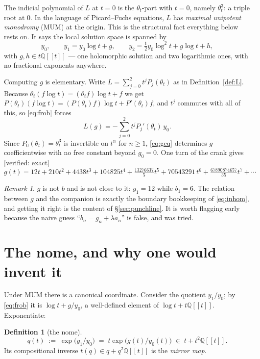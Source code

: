 \documentclass[11pt,reqno]{amsart}
\theoremstyle{plain}
\theoremstyle{definition}
\newtheorem{definition}[theorem]{Definition}
\theoremstyle{remark}
\newtheorem{remark}[theorem]{Remark}
\newcommand{\Q}{\mathbb{Q}}
\newcommand{\Ver}[1]{\textup{\textsf{[verified: #1]}}}
\newcommand{\ta}{\theta_t}
\numberwithin{equation}{section}
\begin{document}
\medskip
The indicial polynomial of $L$ at $t=0$ is the $\ta$-part with $t=0$, namely
$\ta^3$: a triple root at $0$. In the language of Picard--Fuchs equations, $L$
has \emph{maximal unipotent monodromy} (MUM) at the origin. This is the
structural fact everything below rests on. It says the local solution space is
spanned by
\begin{equation}\label{eq:frob}
  y_0,\qquad
  y_1=y_0\log t+g,\qquad
  y_2=\tfrac12y_0\log^2t+g\log t+h,
\end{equation}
with $g,h\in t\Q[[t]]$ --- one holomorphic solution and two logarithmic ones,
with no fractional exponents anywhere.

Computing $g$ is elementary. Write $L=\sum_{j=0}^{2}t^jP_j(\ta)$ as in
Definition~\ref{def:L}. Because $\ta(f\log t)=(\ta f)\log t+f$ we get
$P(\ta)(f\log t)=(P(\ta)f)\log t+P'(\ta)f$, and $t^j$ commutes with all of
this, so \eqref{eq:frob} forces
\begin{equation}\label{eq:geq}
  L(g)=-\sum_{j=0}^{2}t^jP_j'(\ta)\,y_0 .
\end{equation}
Since $P_0(\ta)=\ta^3$ is invertible on $t^n$ for $n\ge1$, \eqref{eq:geq}
determines $g$ coefficientwise with no free constant beyond $g_0=0$. One turn
of the crank gives \Ver{exact}
\begin{equation}\label{eq:g}
  g(t)=12t+210t^2+4438t^3+104825t^4+\tfrac{13276637}{5}t^5+70543291\,t^6
       +\tfrac{67890874657}{35}t^7+\cdots
\end{equation}

\begin{remark}
$g$ is not $b$ and is not close to it: $g_1=12$ while $b_1=6$. The relation
between $g$ and the companion is exactly the boundary bookkeeping of
\eqref{eq:inhom}, and getting it right is the content of
\S\ref{sec:punchline}. It is worth flagging early because the naive guess
``$b_n=g_n+\lambda a_n$'' is false, and was tried.
\end{remark}

\section{The nome, and why one would invent it}

Under MUM there is a canonical coordinate. Consider the quotient $y_1/y_0$; by
\eqref{eq:frob} it is $\log t+g/y_0$, a well-defined element of
$\log t+t\Q[[t]]$. Exponentiate:

\begin{definition}[the nome]\label{def:q}
\[
  q(t)\;:=\;\exp\bigl(y_1/y_0\bigr)\;=\;t\exp\bigl(g(t)/y_0(t)\bigr)
  \;\in\; t+t^2\Q[[t]].
\]
Its compositional inverse $t(q)\in q+q^2\Q[[t]]$ is the \emph{mirror map}.
\end{definition}
\end{document}
